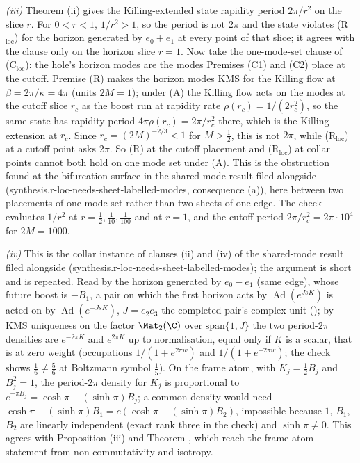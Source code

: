 \emph{(iii)} Theorem (ii) gives the Killing-extended state rapidity period $2\pi/r^{2}$ on the slice $r$. For $0 < r < 1$, $1/r^{2} > 1$, so the period is not $2\pi$ and the state violates (R$_{\mathrm{loc}}$) for the horizon generated by $e_{0} + e_{1}$ at every point of that slice; it agrees with the clause only on the horizon slice $r = 1$. Now take the one-mode-set clause of (C$_{\mathrm{loc}}$): the hole's horizon modes are the modes Premises (C1) and (C2) place at the cutoff. Premise (R) makes the horizon modes KMS for the Killing flow at $\beta = 2\pi/\kappa = 4\pi$ (units $2M = 1$); under (A) the Killing flow acts on the modes at the cutoff slice $r_{c}$ as the boost run at rapidity rate $\rho(r_{c}) = 1/(2r_{c}^{2})$, so the same state has rapidity period $4\pi\rho(r_{c}) = 2\pi/r_{c}^{2}$ there, which is the Killing extension at $r_{c}$. Since $r_{c} = (2M)^{-2/3} < 1$ for $M > \tfrac12$, this is not $2\pi$, while (R$_{\mathrm{loc}}$) at a cutoff point asks $2\pi$. So (R) at the cutoff placement and (R$_{\mathrm{loc}}$) at collar points cannot both hold on one mode set under (A). This is the obstruction found at the bifurcation surface in the shared-mode result filed alongside (synthesis.r-loc-needs-sheet-labelled-modes, consequence (a)), here between two placements of one mode set rather than two sheets of one edge. The check evaluates $1/r^{2}$ at $r = \tfrac12, \tfrac1{10}, \tfrac1{100}$ and at $r = 1$, and the cutoff period $2\pi/r_{c}^{2} = 2\pi \cdot 10^{4}$ for $2M = 1000$.

\emph{(iv)} This is the collar instance of clauses (ii) and (iv) of the shared-mode result filed alongside (synthesis.r-loc-needs-sheet-labelled-modes); the argument is short and is repeated. Read by the horizon generated by $e_{0} - e_{1}$ (same edge), whose future boost is $-B_{1}$, a pair on which the first horizon acts by $\operatorname{Ad}(e^{JsK})$ is acted on by $\operatorname{Ad}(e^{-JsK})$, $J = e_{2}e_{3}$ the completed pair's complex unit (); by KMS uniqueness on the factor $\Mat_{2}(\C)$ over $\mathrm{span}\{1, J\}$ the two period-$2\pi$ densities are $e^{-2\pi K}$ and $e^{2\pi K}$ up to normalisation, equal only if $K$ is a scalar, that is at zero weight (occupations $1/(1 + e^{2\pi w})$ and $1/(1 + e^{-2\pi w})$; the check shows $\tfrac16 \neq \tfrac56$ at Boltzmann symbol $\tfrac15$). On the frame atom, with $K_{j} = \tfrac12 B_{j}$ and $B_{j}^{2} = 1$, the period-$2\pi$ density for $K_{j}$ is proportional to $e^{-\pi B_{j}} = \cosh\pi - (\sinh\pi)B_{j}$; a common density would need $\cosh\pi - (\sinh\pi)B_{1} = c(\cosh\pi - (\sinh\pi)B_{2})$, impossible because $1$, $B_{1}$, $B_{2}$ are linearly independent (exact rank three in the check) and $\sinh\pi \neq 0$. This agrees with Proposition (iii) and Theorem , which reach the frame-atom statement from non-commutativity and isotropy.

